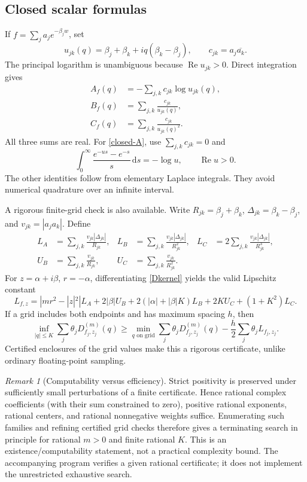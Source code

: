 \documentclass[11pt,a4paper]{article}
\theoremstyle{definition}\newtheorem{definition}[theorem]{Definition}
\theoremstyle{remark}\newtheorem{remark}[theorem]{Remark}
\newcommand{\dd}{\,\mathrm d}
\DeclareMathOperator{\Rea}{Re}\DeclareMathOperator{\Ima}{Im}
\begin{document}
\subsection{Closed scalar formulas}
If $f=\sum_j a_je^{-\beta_jw}$, set
\[
 u_{jk}(q)=\beta_j+\beta_k+iq(\beta_k-\beta_j),
 \qquad c_{jk}=a_j\overline{a_k}.
\]
The principal logarithm is unambiguous because $\Rea u_{jk}>0$. Direct integration gives
\begin{align}
 A_f(q)&=-\sum_{j,k}c_{jk}\log u_{jk}(q),\label{closed-A}\\
 B_f(q)&=\sum_{j,k}\frac{c_{jk}}{u_{jk}(q)},\label{closed-B}\\
 C_f(q)&=\sum_{j,k}\frac{c_{jk}}{u_{jk}(q)^2}.\label{closed-C}
\end{align}
All three sums are real. For \eqref{closed-A}, use $\sum_{j,k}c_{jk}=0$ and
\[
 \int_0^\infty\frac{e^{-us}-e^{-s}}s\dd s=-\log u,
 \qquad\Rea u>0.
\]
The other identities follow from elementary Laplace integrals. They avoid numerical quadrature over an infinite interval.

A rigorous finite-grid check is also available. Write $R_{jk}=\beta_j+\beta_k$, $\Delta_{jk}=\beta_k-\beta_j$, and $v_{jk}=|a_j a_k|$. Define
\begin{align*}
 L_A&=\sum_{j,k}\frac{v_{jk}|\Delta_{jk}|}{R_{jk}},&
 L_B&=\sum_{j,k}\frac{v_{jk}|\Delta_{jk}|}{R_{jk}^2},&
 L_C&=2\sum_{j,k}\frac{v_{jk}|\Delta_{jk}|}{R_{jk}^3},\\
 U_B&=\sum_{j,k}\frac{v_{jk}}{R_{jk}},&
 U_C&=\sum_{j,k}\frac{v_{jk}}{R_{jk}^2}.&&
\end{align*}
For $z=\alpha+i\beta$, $r=-\alpha$, differentiating \eqref{Dkernel} yields the valid Lipschitz constant
\begin{equation}\label{Lip}
 L_{f,z}=|mr^2-|z|^2|L_A+2|\beta|U_B
 +2(|\alpha|+|\beta|K)L_B+2KU_C+(1+K^2)L_C.
\end{equation}
If a grid includes both endpoints and has maximum spacing $h$, then
\begin{equation}\label{grid-bound}
 \inf_{|q|\le K}\sum_j\theta_jD_{f_j,z_j}^{(m)}(q)
 \ge\min_{q\text{ on grid}}\sum_j\theta_jD_{f_j,z_j}^{(m)}(q)
 -\frac h2\sum_j\theta_jL_{f_j,z_j}.
\end{equation}
Certified enclosures of the grid values make this a rigorous certificate, unlike ordinary floating-point sampling.

\begin{remark}[Computability versus efficiency]\label{algorithm}
Strict positivity is preserved under sufficiently small perturbations of a finite certificate. Hence rational complex coefficients (with their sum constrained to zero), positive rational exponents, rational centers, and rational nonnegative weights suffice. Enumerating such families and refining certified grid checks therefore gives a terminating search in principle for rational $m>0$ and finite rational $K$. This is an existence/computability statement, not a practical complexity bound. The accompanying program verifies a given rational certificate; it does not implement the unrestricted exhaustive search.
\end{remark}
\end{document}
